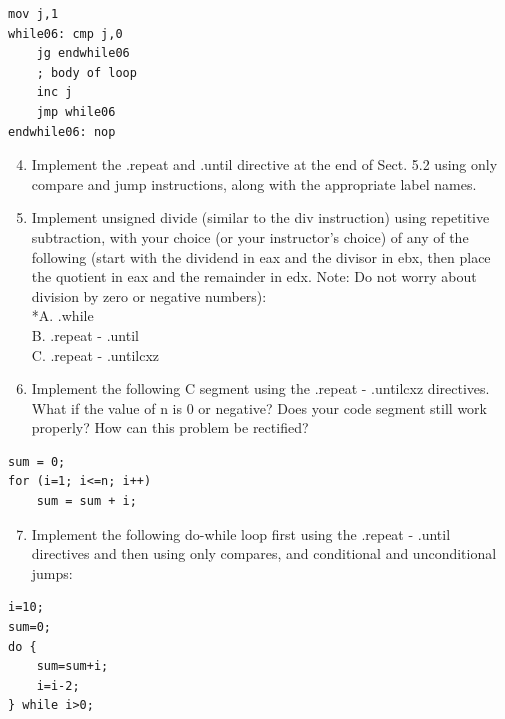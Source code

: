 \documentclass[10pt]{book}
\begin{document}
\begin{verbatim}
mov j,1
while06: cmp j,0
    jg endwhile06
    ; body of loop
    inc j
    jmp while06
endwhile06: nop
\end{verbatim}

\begin{enumerate}
  \setcounter{enumi}{3}
  \item Implement the .repeat and .until directive at the end of Sect. 5.2 using only compare and jump instructions, along with the appropriate label names.
  \item Implement unsigned divide (similar to the div instruction) using repetitive subtraction, with your choice (or your instructor's choice) of any of the following (start with the dividend in eax and the divisor in ebx, then place the quotient in eax and the remainder in edx. Note: Do not worry about division by zero or negative numbers):\\
*A. .while\\
B. .repeat - .until\\
C. .repeat - .untilcxz
  \item Implement the following C segment using the .repeat - .untilcxz directives. What if the value of n is 0 or negative? Does your code segment still work properly? How can this problem be rectified?
\end{enumerate}

\begin{verbatim}
sum = 0;
for (i=1; i<=n; i++)
    sum = sum + i;
\end{verbatim}

\begin{enumerate}
  \setcounter{enumi}{6}
  \item Implement the following do-while loop first using the .repeat - .until directives and then using only compares, and conditional and unconditional jumps:
\end{enumerate}

\begin{verbatim}
i=10;
sum=0;
do {
    sum=sum+i;
    i=i-2;
} while i>0;
\end{verbatim}
\end{document}
